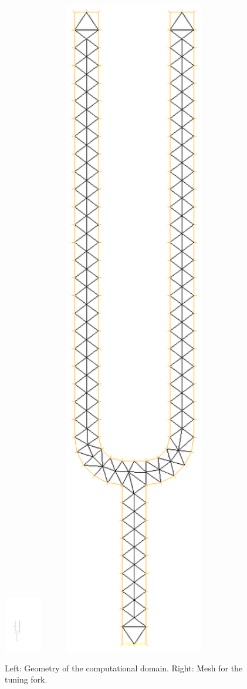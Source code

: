 \documentclass[english,3p]{elsarticle}
\begin{document}
\begin{figure}[h]
\centering
\includegraphics[width=17mm]{fork.pdf}
\hspace{20mm}
\includegraphics[width=80mm]{fork_mesh.eps}
\caption{Left: Geometry of the computational domain. Right: Mesh for the tuning fork.}
\label{fig:mesh_fork}
\end{figure}
\end{document}

